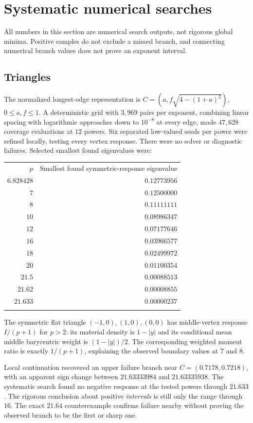 \documentclass[11pt]{article}
\theoremstyle{definition}
\newcommand{\toprule}{\noalign{\hrule height 0.8pt\vskip4pt}}
\newcommand{\midrule}{\noalign{\vskip3pt\hrule height 0.4pt\vskip3pt}}
\newcommand{\bottomrule}{\noalign{\vskip3pt\hrule height 0.8pt}}
\begin{document}
\section{Systematic numerical searches}
All numbers in this section are numerical search outputs, not rigorous
global minima. Positive samples do not exclude a missed branch, and
connecting numerical branch values does not prove an exponent interval.

\subsection{Triangles}
The normalized longest-edge representation is
$C=(a,f\sqrt{4-(1+a)^2})$, $0\le a,f\le1$.
A deterministic grid with $3{,}969$ pairs per exponent, combining linear
spacing with logarithmic approaches down to $10^{-8}$ at every edge,
made $47{,}628$ coverage evaluations at $12$ powers. Six separated
low-valued seeds per power were refined locally, testing every vertex
response. There were no solver or diagnostic failures.
Selected smallest found eigenvalues were:
\begin{center}
\begin{tabular}{@{}rr@{}}
\toprule
$p$ & Smallest found symmetric-response eigenvalue\\
\midrule
$6.828428$ & $0.12773956$\\
$7$ & $0.12500000$\\
$8$ & $0.11111111$\\
$10$ & $0.08986347$\\
$12$ & $0.07177646$\\
$16$ & $0.03966577$\\
$18$ & $0.02499972$\\
$20$ & $0.01100354$\\
$21.5$ & $0.00088513$\\
$21.62$ & $0.00008855$\\
$21.633$ & $0.00000237$\\
\bottomrule
\end{tabular}
\end{center}
The symmetric flat triangle $(-1,0),(1,0),(0,0)$ has middle-vertex
response $I/(p+1)$ for $p>2$: its material density is $1-|y|$ and its
conditional mean middle barycentric weight is $(1-|y|)/2$.
The corresponding weighted moment ratio is exactly $1/(p+1)$,
explaining the observed boundary values at $7$ and $8$.

Local continuation recovered an upper failure branch near
$C=(0.7178,0.7218)$, with an apparent sign change between
$21.63333984$ and $21.63335938$. The systematic search found no negative
response at the tested powers through $21.633$. The rigorous conclusion
about positive \emph{intervals} is still only the range through $16$.
The exact $21.64$ counterexample confirms failure nearby without proving
the observed branch to be the first or sharp one.
\end{document}
